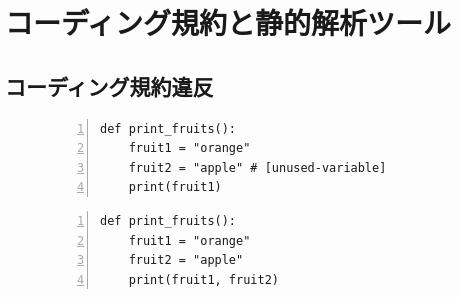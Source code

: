 \documentclass[11pt,dvipdfmx]{jreport}
\begin{document}



\chapter{コーディング規約と静的解析ツール}\label{chap:background}
\section{コーディング規約違反}


\begin{figure}[t]
\vspace{-16pt}
    \begin{lstlisting}[caption={[upper/lower text]%
               \begin{tabular}[t]{@{}l@{}}
                problematic.py \\[1.0\normalbaselineskip]
               \end{tabular}},frame={tb},numbers=left,label=problematic,identifierstyle={\small}]
def print_fruits():
    fruit1 = "orange"
    fruit2 = "apple" # [unused-variable]
    print(fruit1)
\end{lstlisting}
\vspace{-8mm}
\end{figure}

\begin{figure}[t]
    \begin{lstlisting}[caption={[upper/lower text]%
               \begin{tabular}[t]{@{}l@{}}
                correct.py \\[1.0\normalbaselineskip]
               \end{tabular}},frame={tb},numbers=left,label=correct,identifierstyle={\small}]
def print_fruits():
    fruit1 = "orange"
    fruit2 = "apple"
    print(fruit1, fruit2)
\end{lstlisting}
\end{figure}
\end{document}
